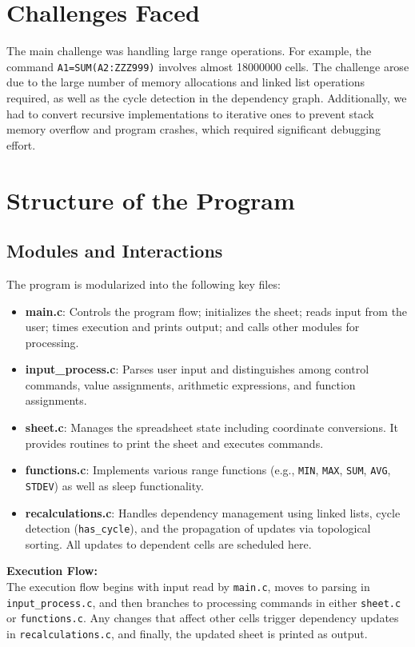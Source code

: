 \documentclass[12pt,letterpaper,onecolumn]{exam}
\begin{document}
\section{Challenges Faced}

The main challenge was handling large range operations. For example, the command \texttt{A1=SUM(A2:ZZZ999)} involves almost 18000000 cells. The challenge arose due to the large number of memory allocations and linked list operations required, as well as the cycle detection in the dependency graph. Additionally, we had to convert recursive implementations to iterative ones to prevent stack memory overflow and program crashes, which required significant debugging effort.

\section{Structure of the Program}

\subsection{Modules and Interactions}

The program is modularized into the following key files:

\begin{itemize}
    \item \textbf{main.c}: Controls the program flow; initializes the sheet; reads input from the user; times execution and prints output; and calls other modules for processing.
    \item \textbf{input\_process.c}: Parses user input and distinguishes among control commands, value assignments, arithmetic expressions, and function assignments.
    \item \textbf{sheet.c}: Manages the spreadsheet state including coordinate conversions. It provides routines to print the sheet and executes commands.
    \item \textbf{functions.c}: Implements various range functions (e.g., \texttt{MIN}, \texttt{MAX}, \texttt{SUM}, \texttt{AVG}, \texttt{STDEV}) as well as sleep functionality.
    \item \textbf{recalculations.c}: Handles dependency management using linked lists, cycle detection (\texttt{has\_cycle}), and the propagation of updates via topological sorting. All updates to dependent cells are scheduled here.
\end{itemize}

\noindent \textbf{Execution Flow:}\\
The execution flow begins with input read by \texttt{main.c}, moves to parsing in \texttt{input\_process.c}, and then branches to processing commands in either \texttt{sheet.c} or \texttt{functions.c}. Any changes that affect other cells trigger dependency updates in \texttt{recalculations.c}, and finally, the updated sheet is printed as output.
\end{document}
